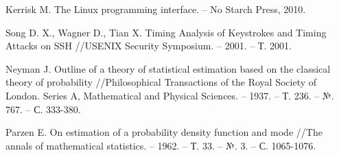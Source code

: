 \begin{thebibliography}{00}
  Kerrisk M. The Linux programming interface. – No Starch Press, 2010.

  Song D. X., Wagner D., Tian X. Timing Analysis of Keystrokes and Timing Attacks on SSH //USENIX Security Symposium. – 2001. – Т. 2001. 

  Neyman J. Outline of a theory of statistical estimation based on the classical theory of probability //Philosophical Transactions of the Royal Society of London. Series A, Mathematical and Physical Sciences. – 1937. – Т. 236. – №. 767. – С. 333-380.

  Parzen E. On estimation of a probability density function and mode //The annals of mathematical statistics. – 1962. – Т. 33. – №. 3. – С. 1065-1076.

\end{thebibliography}
\endgroup

\clearpage
